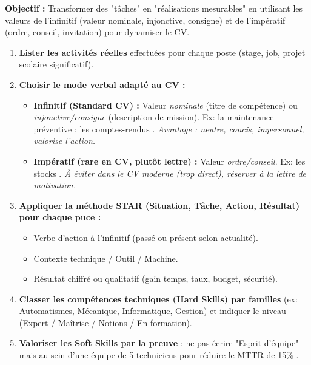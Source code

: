 \documentclass[11pt]{article}
\newcommand{\cle}[1]{{\popxbold\color{popdark}#1}}
\begin{document}
\begin{methode}
\textbf{Objectif :} Transformer des "tâches" en "réalisations mesurables" en utilisant les \cle{valeurs de l'infinitif} (valeur nominale, injonctive, consigne) et de l'\cle{impératif} (ordre, conseil, invitation) pour dynamiser le CV.
\begin{enumerate}
    \item \textbf{Lister les activités réelles} effectuées pour chaque poste (stage, job, projet scolaire significatif).
    \item \textbf{Choisir le mode verbal adapté au CV :}
        \begin{itemize}
            \item \textbf{Infinitif (Standard CV) :} Valeur \emph{nominale} (titre de compétence) ou \emph{injonctive/consigne} (description de mission). Ex: \og \cle{Assurer} la maintenance préventive \fg ; \og \cle{Rédiger} les comptes-rendus \fg. \emph{Avantage : neutre, concis, impersonnel, valorise l'action.}
            \item \textbf{Impératif (rare en CV, plutôt lettre) :} Valeur \emph{ordre/conseil}. Ex: \og \cle{Gérez} les stocks \fg. \emph{À éviter dans le CV moderne (trop direct), réserver à la lettre de motivation.}
        \end{itemize}
    \item \textbf{Appliquer la méthode \cle{STAR} (Situation, Tâche, Action, Résultat) pour chaque puce :}
        \begin{itemize}
            \item Verbe d'action à l'infinitif (passé ou présent selon actualité).
            \item Contexte technique / Outil / Machine.
            \item Résultat chiffré ou qualitatif (gain temps, taux, budget, sécurité).
        \end{itemize}
    \item \textbf{Classer les compétences techniques (Hard Skills) par familles} (ex: Automatismes, Mécanique, Informatique, Gestion) et indiquer le \cle{niveau} (Expert / Maîtrise / Notions / En formation).
    \item \textbf{Valoriser les Soft Skills par la preuve} : ne pas écrire "Esprit d'équipe" mais \og \cle{Collaborer} au sein d'une équipe de 5 techniciens pour réduire le MTTR de 15\% \fg.
\end{enumerate}
\end{methode}
\end{document}
